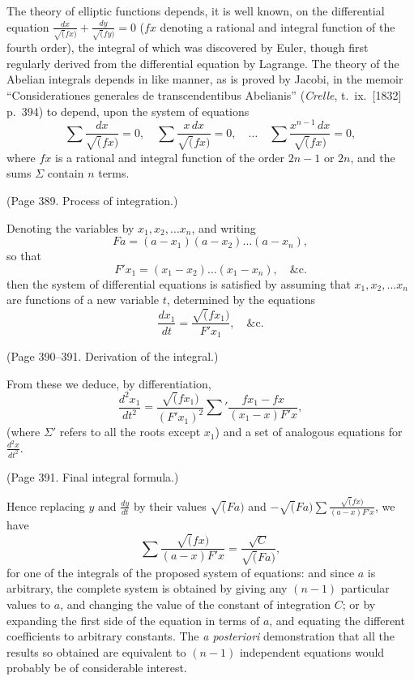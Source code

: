 \documentclass[11pt,a4paper]{article}
\theoremstyle{plain}
\theoremstyle{definition}
\begin{document}
The theory of elliptic functions depends, it is well known, on the differential
equation $\frac{dx}{\surd(fx)} + \frac{dy}{\surd(fy)} = 0$ ($fx$ denoting a rational and integral function
of the fourth order), the integral of which was discovered by Euler, though first regularly derived
from the differential equation by Lagrange. The theory of the Abelian integrals depends
in like manner, as is proved by Jacobi, in the memoir ``Considerationes generales
de transcendentibus Abelianis'' (\textit{Crelle}, t.~ix.\ [1832] p.~394) to depend, upon the system
of equations
\[
\sum \frac{dx}{\surd(fx)} = 0, \quad \sum \frac{x\,dx}{\surd(fx)} = 0, \quad \ldots \quad
\sum \frac{x^{n-1}\,dx}{\surd(fx)} = 0,
\]
where $fx$ is a rational and integral function of the order $2n-1$ or $2n$, and the sums
$\Sigma$ contain $n$ terms.

(Page 389. Process of integration.)

Denoting the variables by $x_1, x_2, \ldots x_n$, and writing
\[
Fa = (a - x_1)(a - x_2)\ldots(a - x_n),
\]
so that
\[
F'x_1 = (x_1 - x_2)\ldots(x_1 - x_n), \quad \&\text{c.}
\]
then the system of differential equations is satisfied by assuming that
$x_1, x_2, \ldots x_n$ are functions of a new variable $t$, determined by the equations
\[
\frac{dx_1}{dt} = \frac{\surd(fx_1)}{F'x_1}, \quad \&\text{c.}
\]

(Page 390--391. Derivation of the integral.)

From these we deduce, by differentiation,
\[
\frac{d^2x_1}{dt^2} = \frac{\surd(fx_1)}{(F'x_1)^2} \sum' \frac{fx_1 - fx}{(x_1 - x)F'x},
\]
(where $\Sigma'$ refers to all the roots except $x_1$) and a set of analogous equations for
$\frac{d^2x}{dt^2}$.

(Page 391. Final integral formula.)

Hence replacing $y$ and $\frac{dy}{dt}$ by their values
$\surd(Fa)$ and $-\surd(Fa) \sum \frac{\surd(fx)}{(a-x)F'x}$,
we have
\[
\sum \frac{\surd(fx)}{(a-x)F'x} = \frac{\sqrt{C}}{\surd(Fa)},
\]
for one of the integrals of the proposed system of equations: and since $a$ is arbitrary,
the complete system is obtained by giving any $(n-1)$ particular values to $a$, and
changing the value of the constant of integration $C$; or by expanding the first side
of the equation in terms of $a$, and equating the different coefficients to arbitrary
constants. The \textit{a posteriori} demonstration that all the results so obtained are equivalent
to $(n-1)$ independent equations would probably be of considerable interest.
\end{document}
